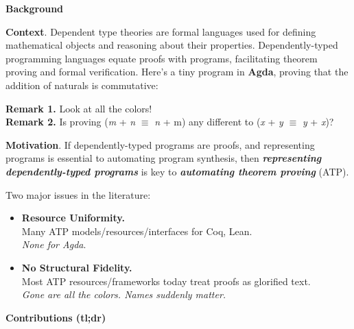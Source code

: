 \documentclass{article}
\newcommand{\sectionfont}{\fontsize{34}{34}\selectfont\setlength{\parskip}{1\baselineskip}}
\newcommand{\nfont}{\fontsize{21}{22}\selectfont\setlength{\parskip}{1\baselineskip}}
\newcommand{\light}[1]{\textcolor{gray!90}{#1}}
\begin{document}
	\begin{minipage}[t]{0.29\textwidth}
	{\sectionfont\textbf{Background}}
	\nfont
	
	\textbf{Context}. Dependent type theories are formal languages used for defining mathematical objects and reasoning about their properties. Dependently-typed programming languages equate proofs with programs, facilitating theorem proving and formal verification. Here's a tiny program in \textbf{Agda}, proving that the addition of naturals is commutative:
	
	\hfill\begin{minipage}{0.9\textwidth}
		
	\end{minipage}
	
	\vspace{-0.5\parskip}
	\hfill\begin{minipage}{0.95\textwidth}
	\light{\textbf{Remark 1.} Look at all the colors! }\\	
	\light{\textbf{Remark 2.} Is proving (\textit{m} + \textit{n} $\equiv$ \textit{n} + m) any different to (\textit{x} + \textit{y} $\equiv$ \textit{y} + \textit{x})? \emoji{thinking}}	
	\end{minipage}
	
	\textbf{Motivation}. If dependently-typed programs are proofs, and representing programs is essential to automating program synthesis, then \textbf{\textit{representing dependently-typed programs}} is key to \textbf{\textit{automating theorem proving}} (ATP).
		
	Two major issues in the literature:
	\begin{itemize}[topsep=-0.75\baselineskip]
		\item \textbf{Resource Uniformity.}\\
		Many ATP models/resources/interfaces for Coq, Lean.\\
		\textit{None for Agda}.
		\item \textbf{No Structural Fidelity.}\\
		Most ATP resources/frameworks today treat proofs as glorified text.\\
		\textit{Gone are all the colors. Names suddenly matter.}
	\end{itemize}

	{\sectionfont\vspace{\parskip}\textbf{Contributions (tl;dr)}}	
	\nfont
	

\end{minipage}
\end{document}
